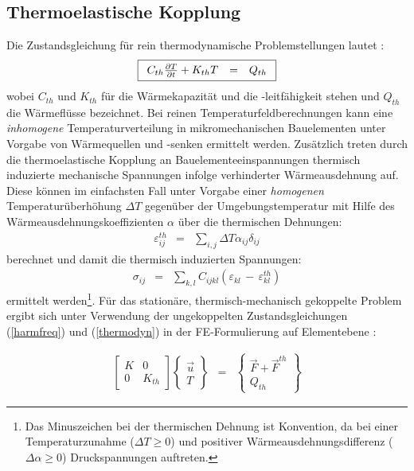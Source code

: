\subsection{Thermoelastische Kopplung}
\label{thermoelastischekopplung}

Die Zustandsgleichung für rein thermodynamische Problemstellungen
lautet \cite{Bol85}:
\begin{equation}
\label{thermodyn}
\fbox{$
 \displaystyle
 \begin{array}{rcl}
 C_{th} \frac{\partial T}{\partial t} + K_{th} T  & = & Q_{th}
 \end{array}
 $}
\end{equation}
wobei $C_{th}$ und $K_{th}$ für die Wärmekapazität und die
-leitfähigkeit stehen und $Q_{th}$ die Wärmeflüsse bezeichnet.
Bei reinen Temperaturfeldberechnungen kann eine {\em inhomogene}
Temperaturverteilung in mikromechanischen Bauelementen unter Vorgabe von
Wärmequellen und -senken ermittelt werden. Zusätzlich treten durch die
thermoelastische Kopplung an Bauelementeeinspannungen thermisch
induzierte mechanische Spannungen infolge verhinderter Wärmeausdehnung auf.
Diese können im einfachsten Fall unter Vorgabe einer {\em homogenen}
Temperaturüberhöhung $\Delta T$ gegenüber der Umgebungstemperatur mit Hilfe
des Wärmeausdehnungskoeffizienten $\alpha$ über die thermischen Dehnungen:
\begin{eqnarray}
\label{thermdehn}
 \varepsilon^{th}_{ij} & = & \sum_{i,j} \Delta T \alpha_{ij} \delta_{ij}
\end{eqnarray}
berechnet und damit die thermisch induzierten Spannungen:
\begin{eqnarray}
\label{thermspan}
 \sigma_{ij} & = & \sum_{k,l} C_{ijkl} (\varepsilon_{kl} \, - \, \varepsilon^{th}_{kl})
\end{eqnarray}
ermittelt werden\footnote{Das Minuszeichen bei der thermischen Dehnung ist
Konvention, da bei einer Temperaturzunahme ($\Delta T \geq 0$) und
positiver Wärmeausdehnungsdifferenz ($\Delta \alpha \geq 0$) Druckspannungen
auftreten.}. Für das stationäre, thermisch-mechanisch gekoppelte Problem
ergibt sich unter Verwendung der ungekoppelten Zustandsgleichungen
(\ref{harmfreq}) und (\ref{thermodyn}) in der FE-Formulierung auf
Elementebene \cite{Koh92}:
\begin{small}
\begin{eqnarray}
\label{thermkopl}
 \left[
 \begin{array}{ll}
  K  & 0   \\
  0  & K_{th}
 \end{array}
 \right ]
 \left \{
 \begin{array}{c}
  \vec u \\
  T
 \end{array} \right \}
                        & = &
\left \{
\begin{array}{c}
\vec F + \vec F^{th} \\
Q_{th}
\end{array} \right \}
\end{eqnarray}
\end{small}
